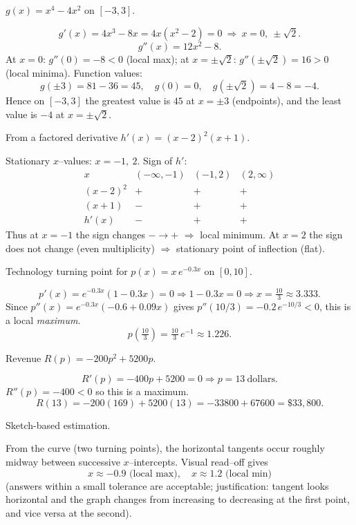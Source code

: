 \documentclass[11pt]{article}
\def\textbf#1{#1}%
\begin{document}
\begin{solution}
\textbf{$g(x)=x^{4}-4x^{2}$ on $[-3,3]$.}

\[
g'(x)=4x^{3}-8x=4x(x^{2}-2)=0 \ \Rightarrow\  x=\boxed{0,\ \pm\sqrt2}.
\]
\[
g''(x)=12x^{2}-8.
\]
At $x=0$: $g''(0)=-8<0$ (local max); at $x=\pm\sqrt2$: $g''(\pm\sqrt2)=16>0$ (local minima).  
Function values:
\[
g(\pm3)=81-36=45,\quad g(0)=0,\quad g(\pm\sqrt2)=4-8=-4.
\]
Hence on $[-3,3]$ the greatest value is $\boxed{45}$ at $x=\pm3$ (endpoints), and the least value is $\boxed{-4}$ at $x=\pm\sqrt2$.
\end{solution}

\begin{solution}
\textbf{From a factored derivative $h'(x)=(x-2)^{2}(x+1)$.}

Stationary $x$–values: $\boxed{x=-1,\ 2}$.  
Sign of $h'$:
\[
\begin{array}{c|cccc}
x & (-\infty,-1) & (-1,2) & (2,\infty)\\\hline
(x-2)^{2} & + & + & +\\
(x+1) & - & + & +\\
h'(x) & - & + & +
\end{array}
\]
Thus at $x=-1$ the sign changes $-\to +$ $\Rightarrow$ \textbf{local minimum}.  
At $x=2$ the sign does not change (even multiplicity) $\Rightarrow$ \textbf{stationary point of inflection} (flat).
\end{solution}

\begin{solution}
\textbf{Technology turning point for $p(x)=x\,e^{-0.3x}$ on $[0,10]$.}

\[
p'(x)=e^{-0.3x}(1-0.3x)=0 \Rightarrow 1-0.3x=0 \Rightarrow x=\boxed{\tfrac{10}{3}\approx 3.333}.
\]
Since $p''(x)=e^{-0.3x}(-0.6+0.09x)$ gives $p''(10/3)=-0.2\,e^{-10/3}<0$, this is a local \emph{maximum}.  
\[
p\!\left(\tfrac{10}{3}\right)=\tfrac{10}{3}\,e^{-1}\approx \boxed{1.226}.
\]
\end{solution}

\begin{solution}
\textbf{Revenue $R(p)=-200p^{2}+5200p$.}

\[
R'(p)=-400p+5200=0 \Rightarrow p=\boxed{13\ \text{dollars}}.
\]
$R''(p)=-400<0$ so this is a maximum.  
\[
R(13)=-200(169)+5200(13)=-33800+67600=\boxed{\$33{,}800}.
\]
\end{solution}

\begin{solution}
\textbf{Sketch-based estimation.}

From the curve (two turning points), the horizontal tangents occur roughly midway between successive $x$–intercepts. Visual read–off gives
\[
\boxed{x\approx -0.9 \text{ (local max)},\quad x\approx 1.2 \text{ (local min)}}
\]
(answers within a small tolerance are acceptable; justification: tangent looks horizontal and the graph changes from increasing to decreasing at the first point, and vice versa at the second).
\end{solution}
\end{document}
